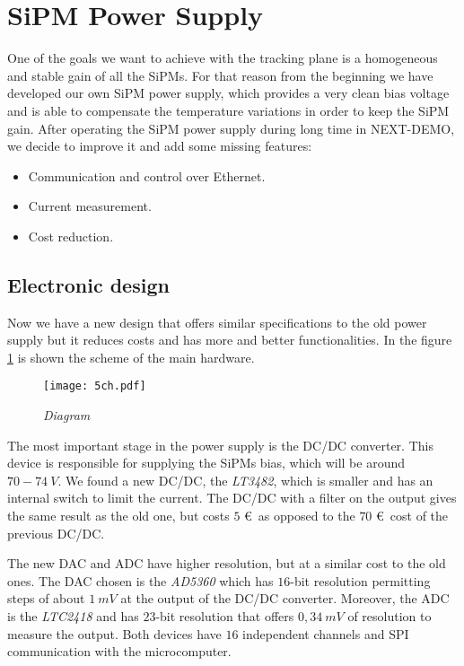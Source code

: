 \section{SiPM Power Supply}

One of the goals we want to achieve with the tracking plane is a homogeneous and stable gain of all the SiPMs. For that reason from the beginning we have developed our own SiPM power supply, which provides a very clean bias voltage and is able to compensate the temperature variations in order to keep the SiPM gain. After operating the SiPM power supply during long time in NEXT-DEMO, we decide to improve it and add some missing features:

\begin{itemize}
\item Communication and control over Ethernet.
\item Current measurement.
\item Cost reduction.
\end{itemize}

\subsection{Electronic design}

Now we have a new design that offers similar specifications to the old power supply but it reduces costs and has more and better functionalities. In the figure \ref{fig:esq} is shown the scheme of the main hardware.

\begin{figure}[ht]
\centering 
\texttt{[image: 5ch.pdf]} 
\caption{\textit{Diagram}} 
\label{fig:esq} 
\end{figure}

The most important stage in the power supply is the DC/DC converter. This device is responsible for supplying the SiPMs bias, which will be around $70-74\ V$. We found a new DC/DC, the \emph{LT3482}, which is smaller and has an internal switch to limit the current. The DC/DC with a filter on the output gives the same result as the old one, but costs $5$ \euro\ as opposed to the $70$ \euro\ cost of the previous DC/DC.

The new DAC and ADC have higher resolution, but at a similar cost to the old ones. The DAC chosen is the \emph{AD5360} which has $16$-bit resolution permitting steps of about $1\ mV$ at the output of the DC/DC converter.  Moreover, the ADC is the \emph{LTC2418} and has $23$-bit resolution that offers $0,34\ mV$ of resolution to measure the output. Both devices have $16$ independent channels and SPI communication with the microcomputer.

